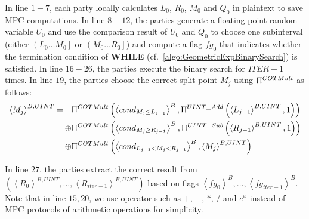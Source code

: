                   In line $1-7$, each party locally calculates $L_0$, $R_0$, $M_0$ and $Q_0$ in plaintext to save MPC computations.
                  In line $8-12$, the parties generate a floating-point random variable $U_0$ and use the comparison result of $U_0$ and $Q_0$ to choose one subinterval (either $\left(L_0\ldots M_0\right] $ or $\left(M_0\ldots R_0\right] $) and compute a flag $fg_0$ that indicates whether the termination condition of \textbf{WHILE} (cf.~\autoref{algo:GeometricExpBinarySearch}) is satisfied.
      In line $16-26$, the parties execute the binary search for $ITER-1$ times.
      In line $19$, the parties choose the correct split-point $M_j$ using $ \Uppi^{COTMult}$ as follows:
      \begin{equation}
            \label{eq:ISMiddlePoint}
            \begin{split}
                  \left\langle {M_j}\right\rangle ^{B,UINT}=\quad & \Uppi^{COTMult}\left(\left\langle cond_{M_{j}\leq L_{j-1}}\right\rangle ^B , \Uppi^{UINT\_Add}\left(\left\langle {L_{j-1}}\right\rangle^{B,UINT},1 \right)\right) \\
                  \oplus &\Uppi^{COTMult}\left(\left\langle cond_{M_{j} \geq R_{j-1}}\right\rangle ^B , \Uppi^{UINT\_Sub}\left(\left\langle {R_{j-1}}\right\rangle ^{B,UINT},1\right)\right)  \\
                  \oplus & \Uppi^{COTMult}\left(\left\langle cond_{L_{j-1}<M_{j} < R_{j-1}}\right\rangle^B , \left\langle {M_j}\right\rangle^{B,UINT}\right)
            \end{split}
      \end{equation}

      In line $27$, the parties extract the correct result from $\left(\left\langle {R_0}\right\rangle ^{B,UINT} ,\ldots ,\left\langle {R_{iter-1}}\right\rangle ^{B,UINT}\right) $ based on flags $\left\langle fg_0\right\rangle ^{B},\ldots,\left\langle fg_{iter-1}\right\rangle ^{B}$.
      Note that in line $15,20$, we use operator such as $+$, $-$, $*$, $/$ and $e^{x}$ instead of MPC protocols of arithmetic operations for simplicity.

